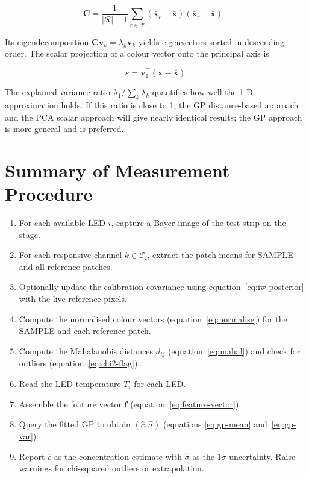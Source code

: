 \documentclass[11pt, a4paper]{article}
\newcommand{\bx}{\mathbf{x}}
\newcommand{\bC}{\mathbf{C}}
\begin{document}
\begin{equation}
  \bC = \frac{1}{|\mathcal{R}|-1}
        \sum_{r \in \mathcal{R}}
        (\bar{\bx}_r - \bar{\bx})(\bar{\bx}_r - \bar{\bx})^{\top}.
  \label{eq:between-cov}
\end{equation}

Its eigendecomposition $\bC\mathbf{v}_k = \lambda_k \mathbf{v}_k$
yields eigenvectors sorted in descending order.
The scalar projection of a colour vector onto the principal axis is

\begin{equation}
  s = \mathbf{v}_1^{\top}(\bx - \bar{\bx}).
  \label{eq:pca-project}
\end{equation}

The explained-variance ratio $\lambda_1 / \sum_k \lambda_k$ quantifies
how well the 1-D approximation holds.  If this ratio is close to 1,
the GP distance-based approach and the PCA scalar approach will give
nearly identical results; the GP approach is more general and is
preferred.

\section{Summary of Measurement Procedure}

\begin{enumerate}
  \item For each available LED $i$, capture a Bayer image of the
    test strip on the stage.

  \item For each responsive channel $k \in \mathcal{C}_i$, extract
    the patch means for SAMPLE and all reference patches.

  \item Optionally update the calibration covariance using
    equation~\eqref{eq:iw-posterior} with the live reference pixels.

  \item Compute the normalised colour vectors
    (equation~\eqref{eq:normalise}) for the SAMPLE and each
    reference patch.

  \item Compute the Mahalanobis distances
    $d_{ij}$ (equation~\eqref{eq:mahal}) and check for outliers
    (equation~\eqref{eq:chi2-flag}).

  \item Read the LED temperature $T_i$ for each LED.

  \item Assemble the feature vector $\mathbf{f}$
    (equation~\eqref{eq:feature-vector}).

  \item Query the fitted GP to obtain
    $(\hat{c}, \hat{\sigma})$ (equations \eqref{eq:gp-mean}
    and~\eqref{eq:gp-var}).

  \item Report $\hat{c}$ as the concentration estimate with
    $\hat{\sigma}$ as the $1\sigma$ uncertainty.
    Raise warnings for chi-squared outliers or extrapolation.
\end{enumerate}
\end{document}
